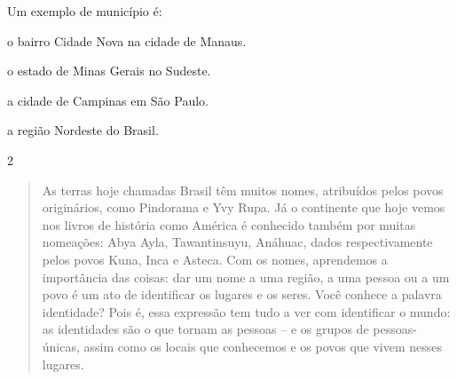 Um exemplo de município é:

\begin{escolha}
\item o bairro Cidade Nova na cidade de Manaus.

\item o estado de Minas Gerais no Sudeste.

\item a cidade de Campinas em São Paulo.

\item a região Nordeste do Brasil.
\end{escolha}


\num{2}

\begin{quote}
As terras hoje chamadas Brasil têm muitos nomes, atribuídos pelos
povos originários, como Pindorama e Yvy Rupa. Já o continente que hoje
vemos nos livros de história como América é conhecido também por muitas
nomeações: Abya Ayla, Tawantinsuyu, Anáhuac, dados respectivamente pelos
povos Kuna, Inca e Asteca. Com os nomes, aprendemos a importância das
coisas: dar um nome a uma região, a uma pessoa ou a um povo é um ato de
identificar os lugares e os seres. Você conhece a palavra identidade?
Pois é, essa expressão tem tudo a ver com identificar o mundo: as
identidades são o que tornam as pessoas -- e os grupos de pessoas-
únicas, assim como os locais que conhecemos e os povos que vivem nesses
lugares.

\end{quote}

